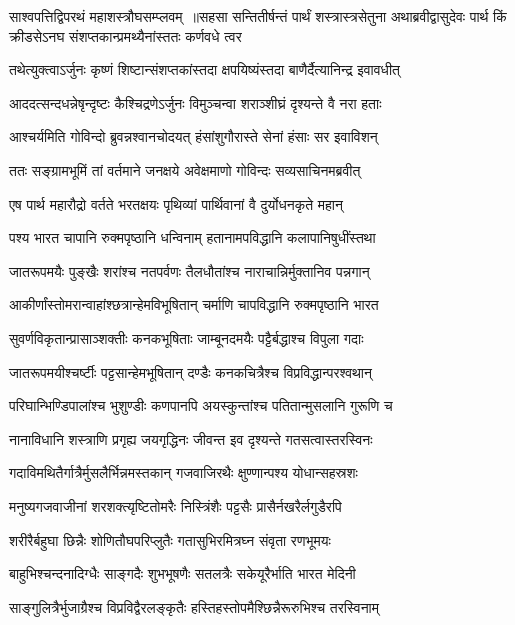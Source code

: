 साश्वपत्तिद्विपरथं महाशस्त्रौघसम्प्लवम् ॥सहसा सन्तितीर्षन्तं पार्थं शस्त्रास्त्रसेतुना
\twolineshloka
{अथाब्रवीद्वासुदेवः पार्थ किं क्रीडसेऽनघ}
{संशप्तकान्प्रमथ्यैनांस्ततः कर्णवधे त्वर}


\twolineshloka
{तथेत्युक्त्वाऽर्जुनः कृष्णं शिष्टान्संशप्तकांस्तदा}
{क्षपयिष्यंस्तदा बाणैर्दैत्यानिन्द्र इवावधीत्}


\twolineshloka
{आददत्सन्दधन्नेषृन्दृष्टः कैश्चिद्रणेऽर्जुनः}
{विमुञ्चन्वा शराञ्शीघ्रं दृश्यन्ते वै नरा हताः}


\twolineshloka
{आश्चर्यमिति गोविन्दो ब्रुवन्नश्वानचोदयत्}
{हंसांशुगौरास्ते सेनां हंसाः सर इवाविशन्}


\twolineshloka
{ततः सङ्ग्रामभूमिं तां वर्तमाने जनक्षये}
{अवेक्षमाणो गोविन्दः सव्यसाचिनमब्रवीत्}


\twolineshloka
{एष पार्थ महारौद्रो वर्तते भरतक्षयः}
{पृथिव्यां पार्थिवानां वै दुर्योधनकृते महान्}


\twolineshloka
{पश्य भारत चापानि रुक्मपृष्ठानि धन्विनाम्}
{हतानामपविद्धानि कलापानिषुधींस्तथा}


\twolineshloka
{जातरूपमयैः पुङ्खैः शरांश्च नतपर्वणः}
{तैलधौतांश्च नाराचान्निर्मुक्तानिव पन्नगान्}


\twolineshloka
{आकीर्णांस्तोमरान्वाहांश्छत्रान्हेमविभूषितान्}
{चर्माणि चापविद्धानि रुक्मपृष्ठानि भारत}


\twolineshloka
{सुवर्णविकृतान्प्रासाञ्शक्तीः कनकभूषिताः}
{जाम्बूनदमयैः पट्टैर्बद्धाश्च विपुला गदाः}


\twolineshloka
{जातरूपमयीश्चर्ष्टीः पट्टसान्हेमभूषितान्}
{दण्डैः कनकचित्रैश्च विप्रविद्धान्परश्वथान्}


\twolineshloka
{परिघान्भिण्डिपालांश्च भुशुण्डीः कणपानपि}
{अयस्कुन्तांश्च पतितान्मुसलानि गुरूणि च}


\twolineshloka
{नानाविधानि शस्त्राणि प्रगृह्य जयगृद्धिनः}
{जीवन्त इव दृश्यन्ते गतसत्वास्तरस्विनः}


\twolineshloka
{गदाविमथितैर्गात्रैर्मुसलैर्भिन्नमस्तकान्}
{गजवाजिरथैः क्षुण्णान्पश्य योधान्सहस्रशः}


\twolineshloka
{मनुष्यगजवाजीनां शरशक्त्यृष्टितोमरैः}
{निस्त्रिंशैः पट्टसैः प्रासैर्नखरैर्लगुडैरपि}


\twolineshloka
{शरीरैर्बहुघा छिन्नैः शोणितौघपरिप्लुतैः}
{गतासुभिरमित्रघ्न संवृता रणभूमयः}


\twolineshloka
{बाहुभिश्चन्दनादिग्धैः साङ्गदैः शुभभूषणैः}
{सतलत्रैः सकेयूरैर्भाति भारत मेदिनी}


\twolineshloka
{साङ्गुलित्रैर्भुजाग्रैश्च विप्रविद्वैरलङ्कृतैः}
{हस्तिहस्तोपमैश्छिन्नैरूरुभिश्च तरस्विनाम्}


